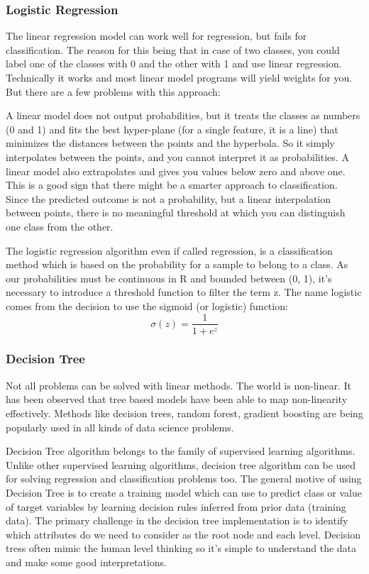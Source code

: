 \documentclass[12pt]{article}
\begin{document}
\subsubsection{Logistic Regression}

The linear regression model can work well for regression, but fails for classification. The reason for this being that in case of two classes, you could label one of the classes with 0 and the other with 1 and use linear regression. Technically it works and most linear model programs will yield weights for you. But there are a few problems with this approach:

A linear model does not output probabilities, but it treats the classes as numbers (0 and 1) and fits the best hyper-plane (for a single feature, it is a line) that minimizes the distances between the points and the hyperbola. So it simply interpolates between the points, and you cannot interpret it as probabilities. A linear model also extrapolates and gives you values below zero and above one. This is a good sign that there might be a smarter approach to classification. Since the predicted outcome is not a probability, but a linear interpolation between points, there is no meaningful threshold at which you can distinguish one class from the other. 

The logistic regression algorithm even if called regression, is a classification method which is based on the probability for
a sample to belong to a class. As our probabilities must be continuous in R and bounded between (0, 1), it's necessary to introduce a threshold function to filter the term z. The name logistic comes from the decision to use the sigmoid (or logistic) function:
\begin{equation}
\sigma(z) = \dfrac{1}{1+e^z}
\end{equation}
\subsubsection{Decision Tree}

Not all problems can be solved with linear methods. The world is non-linear. It has been observed that tree based models have been able to map non-linearity effectively. Methods like decision trees, random forest, gradient boosting are being popularly used in all kinds of data science problems.

Decision Tree algorithm belongs to the family of supervised learning algorithms. Unlike other supervised learning algorithms, decision tree algorithm can be used for solving regression and classification problems too. The general motive of using Decision Tree is to create a training model which can use to predict class or value of target variables by learning decision rules inferred from prior data (training data). The primary challenge in the decision tree implementation is to identify which attributes do we need to consider as the root node and each level. Decision tress often mimic the human level thinking so it’s simple to understand the data and make some good interpretations.
\end{document}
